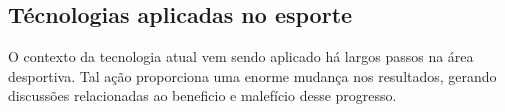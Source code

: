 \subsection{Técnologias aplicadas no esporte}

O contexto da tecnologia atual vem sendo aplicado há largos passos na área desportiva. Tal ação proporciona uma enorme mudança nos resultados, gerando discussões relacionadas ao beneficio e malefício desse progresso.